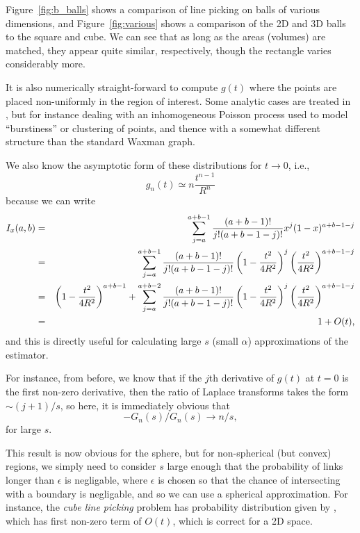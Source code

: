 \documentclass{article}
\begin{document}
Figure~\ref{fig:b_balls} shows a comparison of line picking on
balls of various dimensions, and Figure~\ref{fig:various} shows a
comparison of the 2D and 3D balls to the square and cube. We can see
that as long as the areas (volumes) are matched, they appear quite
similar, respectively, though the rectangle varies considerably more.

It is also numerically straight-forward to compute $g(t)$ where the
points are placed non-uniformly in the region of interest. Some
analytic cases are treated in \cite{tu00:_circle_line}, but for
instance dealing with an inhomogeneous Poisson process used to model
``burstiness'' or clustering of points, and thence with a somewhat
different structure than the standard Waxman graph.


We also know the asymptotic form of these distributions for $t
\rightarrow 0$, i.e., 
\begin{equation}
  \label{eq:asympt_line_picking}
  g_n(t) \simeq n \frac{t^{n-1}}{R^n}
\end{equation}
because we can write %
\begin{eqnarray*} 
   I_x(a,b) 
& = & \sum_{j=a}^{a+b-1} {(a+b-1)! \over j!(a+b-1-j)!} x^j (1-x)^{a+b-1-j} \\
& = & \sum_{j=a}^{a+b-1} {(a+b-1)! \over j!(a+b-1-j)!} 
        \left(1 - \frac{t^2}{4 R^2}\right)^j \left( \frac{t^2}{4 R^2} \right)^{a+b-1-j} \\
& = & \left(1 - \frac{t^2}{4 R^2}\right)^{a+b-1}
       + \sum_{j=a}^{a+b-2} {(a+b-1)! \over j!(a+b-1-j)!} 
        \left(1 - \frac{t^2}{4 R^2}\right)^j \left( \frac{t^2}{4 R^2} \right)^{a+b-1-j} \\
& = & 1 + O(t),
\end{eqnarray*}
and this is directly useful for calculating large $s$ (small $\alpha$)
approximations of the estimator.

For instance, from before, we know that if the $j$th derivative of
$g(t)$ at $t = 0$ is the first non-zero derivative, then the ratio of
Laplace transforms takes the form $\sim (j+1)/s$, so here, it is
immediately obvious that
\[ -G_n(s)/G_n(s) \rightarrow n/s, \]
for large $s$. 

This result is now obvious for the sphere, but for non-spherical (but
convex) regions, we simply need to consider $s$ large enough that the
probability of links longer than $\epsilon$ is negligable, where
$\epsilon$ is chosen so that the chance of intersecting with a
boundary is negligable, and so we can use a spherical
approximation. For instance, the {\em cube line picking} problem has
probability distribution given by \cite{weisstein:_cube_line_picking},
which has first non-zero term of $O(t)$, which is correct for a 2D
space.
\end{document}
